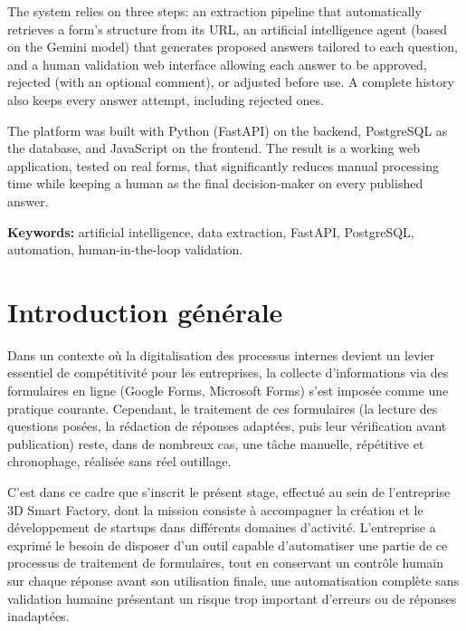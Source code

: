 \documentclass[12pt,a4paper]{report}
\begin{document}
The system relies on three steps: an extraction pipeline that automatically
retrieves a form's structure from its URL, an artificial intelligence agent
(based on the Gemini model) that generates proposed answers tailored to
each question, and a human validation web interface allowing each answer to
be approved, rejected (with an optional comment), or adjusted
before use. A complete history also
keeps every answer attempt, including rejected ones.

The platform was built with Python (FastAPI) on the backend, PostgreSQL as
the database, and JavaScript on the frontend. The result is a working web
application, tested on real forms, that significantly reduces manual
processing time while keeping a human as the final decision-maker on every
published answer.

\textbf{Keywords:} artificial intelligence, data extraction, FastAPI,
PostgreSQL, automation, human-in-the-loop validation.

\tableofcontents
\listoffigures
\listoftables

\chapter*{Introduction générale}


Dans un contexte où la digitalisation des processus internes devient un
levier essentiel de compétitivité pour les entreprises, la collecte
d'informations via des formulaires en ligne (Google Forms, Microsoft Forms)
s'est imposée comme une pratique courante. Cependant, le traitement de ces
formulaires (la lecture des questions posées, la rédaction de réponses
adaptées, puis leur vérification avant publication) reste, dans de
nombreux cas, une tâche manuelle, répétitive et chronophage, réalisée sans
réel outillage.

C'est dans ce cadre que s'inscrit le présent stage, effectué au sein de
l'entreprise 3D Smart Factory, dont la mission consiste à accompagner la
création et le développement de startups dans différents domaines
d'activité. L'entreprise a exprimé le besoin de disposer d'un outil capable
d'automatiser une partie de ce processus de traitement de formulaires, tout
en conservant un contrôle humain sur chaque réponse avant son utilisation
finale, une automatisation complète sans validation humaine présentant
un risque trop important d'erreurs ou de réponses inadaptées.
\end{document}
